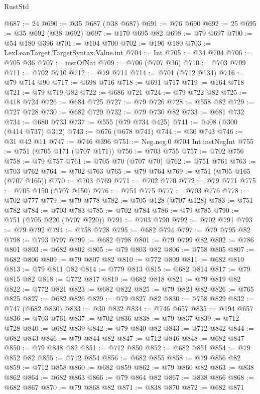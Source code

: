 \begin{lexlean}{RustStd}
\begin{coremodule}
{\begin{coremodule}
{{{{{{{{{{{{{{{{{{{{{{{{{{{{{{{@687 := 24
@690 := @35 @687 (@38 @687)
@691 := @76 @690
@692 := 25
@695 := @35 @692 (@38 @692)
@697 := @170 @695 @82
@698 := @79 @697
@700 := @54 @180 @396
@701 := @104 @700
@702 := @196 @180
@703 := LexLeanTarget.TargetSyntax.Value.int
@704 := Int
@705 := @34 @704
@706 := @705 @36
@707 := instOfNat
@709 := @706 (@707 @36)
@710 := @703 @709
@711 := @702 @710
@712 := @79 @711
@714 := @701 (@712 @134)
@716 := @79 @714 @90
@717 := @698 @716
@718 := @691 @717
@719 := @164 @718
@721 := @79 @719 @82
@722 := @686 @721
@724 := @79 @722 @82
@725 := @418 @724
@726 := @684 @725
@727 := @79 @726
@728 := @558 @82
@729 := @727 @728
@730 := @682 @729
@732 := @79 @730 @82
@733 := @681 @732
@734 := @680 @733
@737 := @555 (@79 @734 @425)
@741 := @408 (@300 (@414 @737) @312)
@743 := @676 (@678 @741)
@744 := @30 @743
@746 := @31 @42 @11
@747 := @746 @396
@751 := Neg.neg.{0} @704 Int.instNegInt
@755 := @751 (@705 @171 (@707 @171))
@756 := @703 @755
@757 := @702 @756
@758 := @79 @757
@761 := @705 @70 (@707 @70)
@762 := @751 @761
@763 := @703 @762
@764 := @702 @763
@765 := @79 @764
@769 := @751 (@705 @165 (@707 @165))
@770 := @703 @769
@771 := @702 @770
@772 := @79 @771
@775 := @705 @150 (@707 @150)
@776 := @751 @775
@777 := @703 @776
@778 := @702 @777
@779 := @79 @778
@782 := @705 @128 (@707 @128)
@783 := @751 @782
@784 := @703 @783
@785 := @702 @784
@786 := @79 @785
@790 := @751 (@705 @220 (@707 @220))
@791 := @703 @790
@792 := @702 @791
@793 := @79 @792
@794 := @758 @728
@795 := @682 @794
@797 := @79 @795 @82
@798 := @793 @797
@799 := @682 @798
@801 := @79 @799 @82
@802 := @786 @801
@803 := @682 @802
@805 := @79 @803 @82
@806 := @758 @805
@807 := @682 @806
@809 := @79 @807 @82
@810 := @772 @809
@811 := @682 @810
@813 := @79 @811 @82
@814 := @779 @813
@815 := @682 @814
@817 := @79 @815 @82
@818 := @772 @817
@819 := @682 @818
@821 := @79 @819 @82
@822 := @772 @821
@823 := @682 @822
@825 := @79 @823 @82
@826 := @765 @825
@827 := @682 @826
@829 := @79 @827 @82
@830 := @758 @829
@832 := @747 (@682 @830)
@833 := @30 @832
@834 := @746 @657
@835 := @194 @657
@836 := @703 @761
@837 := @702 @836
@838 := @79 @837
@839 := @712 @728
@840 := @682 @839
@842 := @79 @840 @82
@843 := @712 @842
@844 := @682 @843
@846 := @79 @844 @82
@847 := @712 @846
@848 := @682 @847
@850 := @79 @848 @82
@851 := @712 @850
@852 := @682 @851
@854 := @79 @852 @82
@855 := @712 @854
@856 := @682 @855
@858 := @79 @856 @82
@859 := @712 @858
@860 := @682 @859
@862 := @79 @860 @82
@863 := @838 @862
@864 := @682 @863
@866 := @79 @864 @82
@867 := @838 @866
@868 := @682 @867
@870 := @79 @868 @82
@871 := @838 @870
@872 := @682 @871
}}}}}}}}}}}}}}}}}}}}}}}}}}}}}}}
\end{coremodule}}
\end{coremodule}
\end{lexlean}
